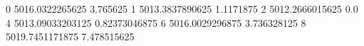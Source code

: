 0 5016.0322265625 3.765625
1 5013.3837890625 1.1171875
2 5012.2666015625 0.0
4 5013.09033203125 0.82373046875
6 5016.0029296875 3.736328125
8 5019.7451171875 7.478515625
